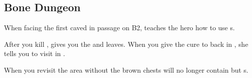 \subsection{Bone Dungeon}
\label{map:bone_dungeon}

When facing the first caved in passage on B2,  teaches the hero how to use s.

After you kill ,  gives you the  and leaves. When you give the cure to  back in , she tells you to visit  in .

When you revisit the area without  the brown chests will no longer contain  but s.

